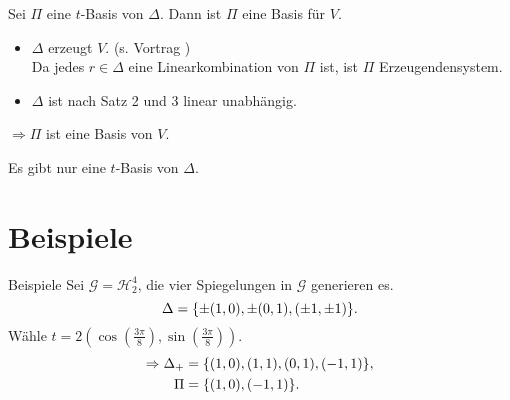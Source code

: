 \documentclass[18pt]{beamer}
\begin{document}
\begin{frame}
    \begin{theorem} %
        Sei \( \Pi \) eine \(t\)-Basis von \( \Delta \). Dann ist 
        \( \Pi \) eine Basis für \( V \).
    \end{theorem}

    \begin{bew}
        \begin{itemize}
            \item \( \Delta \) erzeugt \( V \). (s. Vortrag )\\
            Da jedes \( r \in \Delta \) eine Linearkombination von \( \Pi \) ist, 
            ist \( \Pi \) Erzeugendensystem.
            \item \( \Delta \) ist nach Satz 2 und 3 linear unabhängig.
        \end{itemize}
        \( \Rightarrow \Pi \) ist eine Basis von \(V\).
    \end{bew}
\end{frame}

\begin{frame}
    \begin{satz} %
        Es gibt nur eine \( t \)-Basis von \( \Delta \).
    \end{satz}
\end{frame}

\section{Beispiele}
\begin{frame}{Beispiele}
    Sei \( \mathscr{G} = \mathscr{H}_2^4 \), 
    die vier Spiegelungen in \( \mathscr{G} \) 
    generieren es.
    \[ \Delta = \{ \pm(1,0), \pm(0,1), (\pm 1, \pm 1) \}. \]
    Wähle \( t = 2( \cos(\frac{3\pi}{8}), \sin(\frac{3\pi}{8}) ) \).
    \begin{align*}
        \Rightarrow \Delta_+ 
        &= \{(1,0), (1,1), (0,1), (-1,1)\}, \\
        \Pi &= \{ (1,0), (-1,1) \}.
    \end{align*}
\end{frame}
\end{document}
